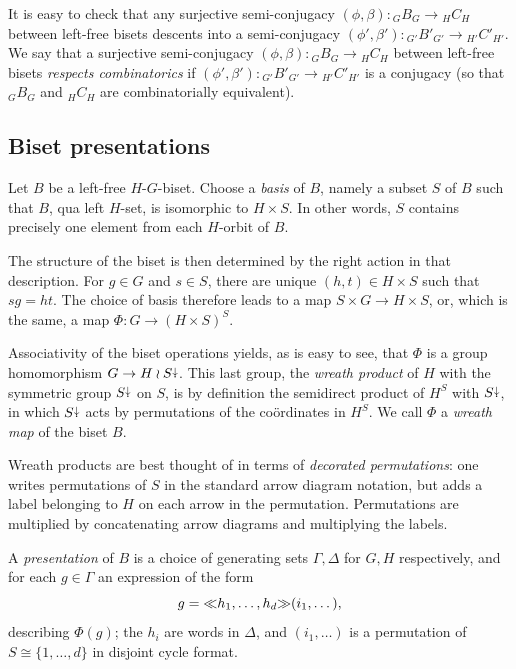 \documentclass{amsart}
\begin{document}
It is easy to check that any surjective semi-conjugacy
$(\phi,\beta)\colon {}_GB_G\to {}_H C_H$ between left-free bisets
descents into a semi-conjugacy
$ (\phi',\beta')\colon {}_{G'}B'_{G'}\to {}_{H'}C'_{H'}$. We say that
a surjective semi-conjugacy $(\phi,\beta)\colon {}_GB_G\to {}_H C_H$
between left-free bisets \emph{respects combinatorics} if
$ (\phi',\beta')\colon {}_{G'}B'_{G'}\to {}_{H'}C'_{H'}$ is a
conjugacy (so that ${}_GB_G$ and $ {}_H C_H$ are combinatorially
equivalent).

\subsection{Biset presentations}\label{ss:wreath}
Let $B$ be a left-free $H$-$G$-biset. Choose a \emph{basis} of $B$,
namely a subset $S$ of $B$ such that $B$, qua left $H$-set, is
isomorphic to $H\times S$. In other words, $S$ contains precisely one
element from each $H$-orbit of $B$.

The structure of the biset is then determined by the right action in
that description. For $g\in G$ and $s\in S$, there are unique
$(h,t)\in H\times S$ such that $s g=ht$.  The choice of basis therefore
leads to a map $S\times G\to H\times S$, or, which is the same, a map
$\Phi\colon G\to(H\times S)^S$.

Associativity of the biset operations yields, as is easy to see, that
$\Phi$ is a group homomorphism $G\to H\wr S{\stackrel{\downarrow}{\smash.}}$. This last group, the
\emph{wreath product} of $H$ with the symmetric group $S{\stackrel{\downarrow}{\smash.}}$ on $S$, is
by definition the semidirect product of $H^S$ with $S{\stackrel{\downarrow}{\smash.}}$, in which
$S{\stackrel{\downarrow}{\smash.}}$ acts by permutations of the co\"ordinates in $H^S$. We call $\Phi$
a \emph{wreath map} of the biset $B$.

Wreath products are best thought of in terms of \emph{decorated
  permutations}: one writes permutations of $S$ in the standard arrow
diagram notation, but adds a label belonging to $H$ on each arrow in
the permutation. Permutations are multiplied by concatenating arrow
diagrams and multiplying the labels.

A \emph{presentation} of $B$ is a choice of generating sets $\Gamma,\Delta$
for $G,H$ respectively, and for each $g\in\Gamma$ an expression of the form
\[g={\ll}h_1,\dots,h_d{\gg}(i_1,\dots),\] describing $\Phi(g)$; the $h_i$ are
words in $\Delta$, and $(i_1,\dots)$ is a permutation of
$S\cong\{1,\dots,d\}$ in disjoint cycle format.
\end{document}
